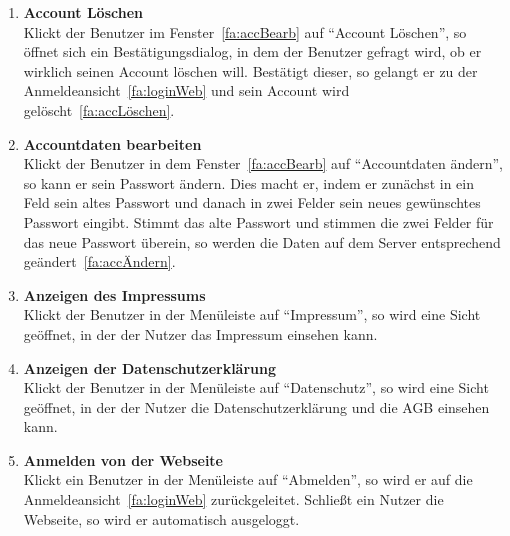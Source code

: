 \begin{enumerate}
\item \label{fa:accLöschenWeb}\textbf{Account Löschen} \hfill \\
Klickt der Benutzer im Fenster~\eqref{fa:accBearb} auf ``Account Löschen'', so öffnet sich ein Bestätigungsdialog, in dem der Benutzer gefragt wird, ob er wirklich seinen Account löschen will. Bestätigt dieser, so gelangt er zu der Anmeldeansicht~\eqref{fa:loginWeb} und sein Account wird gelöscht~\eqref{fa:accLöschen}.

\item \label{fa:accDatBearb}\textbf{Accountdaten bearbeiten} \hfill \\
Klickt der Benutzer in dem Fenster~\eqref{fa:accBearb} auf ``Accountdaten ändern'', so kann er sein Passwort ändern. Dies macht er, indem er zunächst in ein Feld sein altes Passwort und danach in zwei Felder sein neues gewünschtes Passwort eingibt. Stimmt das alte Passwort und stimmen die zwei Felder für das neue Passwort überein, so werden die Daten auf dem Server entsprechend geändert~\eqref{fa:accÄndern}.

\item \label{fa:impressumWeb} \textbf{Anzeigen des Impressums} \hfill \\
Klickt der Benutzer in der Menüleiste auf ``Impressum'', so wird eine Sicht geöffnet, in der der Nutzer das Impressum einsehen kann.

\item \label{fa:datenschutzWeb} \textbf{Anzeigen der Datenschutzerklärung} \hfill \\
Klickt der Benutzer in der Menüleiste auf ``Datenschutz'', so wird eine Sicht geöffnet, in der der Nutzer die Datenschutzerklärung und die AGB einsehen kann.

\item \label{fa:weblogOut}\textbf{Anmelden von der Webseite} \hfill \\
Klickt ein Benutzer in der Menüleiste auf ``Abmelden'', so wird er auf die Anmeldeansicht~\eqref{fa:loginWeb} zurückgeleitet. Schließt ein Nutzer die Webseite, so wird er automatisch ausgeloggt.

\end{enumerate}